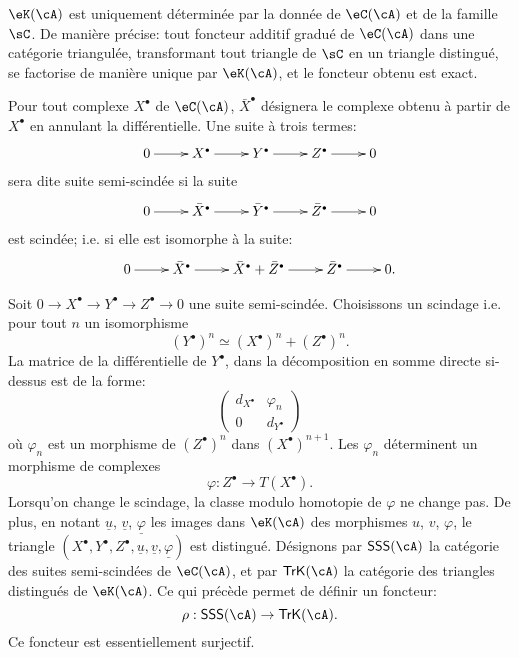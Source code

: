 $\eK(\cA)$ est uniquement déterminée par la donnée de $\eC(\cA)$ et de la 
famille $\sC$. De manière précise: tout foncteur additif gradué de 
$\eC(\cA)$ dans une catégorie triangulée, transformant tout triangle de 
$\sC$ en un triangle distingué, se factorise de manière unique par 
$\eK(\cA)$, et le foncteur obtenu est exact. 

Pour tout complexe $X^\bullet$ de $\eC(\cA)$, $\bar X^\bullet$ désignera le 
complexe obtenu à partir de $X^\bullet$ en annulant la différentielle. Une 
suite à trois termes: 
\[\xymatrix{
  0 \ar[r] 
    & X^\bullet \ar[r] 
    & Y^\bullet \ar[r] 
    & Z^\bullet \ar[r] 
    & 0 
}\]
sera dite suite semi-scindée si la suite 
\[\xymatrix{
  0 \ar[r] 
    & \bar X^\bullet \ar[r] 
    & \bar Y^\bullet \ar[r] 
    & \bar Z^\bullet \ar[r] 
    & 0 
}\]
est scindée; i.e. si elle est isomorphe à la suite: 
\[\xymatrix{
  0 \ar[r] 
    & \bar X^\bullet \ar[r] 
    & \bar X^\bullet + \bar Z^\bullet \ar[r] 
    & \bar Z^\bullet \ar[r] 
    & 0 \text{.}
}\]

Soit $0 \to X^\bullet \to Y^\bullet \to Z^\bullet \to 0$ une suite 
semi-scindée. Choisissons un scindage i.e. pour tout $n$ un isomorphisme 
\[
  (Y^\bullet)^n \simeq (X^\bullet)^n + (Z^\bullet)^n \text{.}
\]
La matrice de la différentielle de $Y^\bullet$, dans la décomposition en 
somme directe si-dessus est de la forme: 
\[
  \begin{pmatrix}
    d_{X^\bullet} & \varphi_n \\
    0 & d_{Y^\bullet} 
  \end{pmatrix}
\]
où $\varphi_n$ est un morphisme de $(Z^\bullet)^n$ dans 
$(X^\bullet)^{n+1}$. Les $\varphi_n$ déterminent un morphisme de complexes 
\[
  \varphi:Z^\bullet \to T(X^\bullet) \text{.}
\]
Lorsqu'on change le scindage, la classe modulo homotopie de $\varphi$ ne 
change pas. De plus, en notant $\underline u$, $\underline v$, 
$\underline\varphi$ les images dans $\eK(\cA)$ des morphismes $u$, $v$, 
$\varphi$, le triangle 
$(X^\bullet,Y^\bullet,Z^\bullet,\underline u,\underline v,\underline\varphi)$ 
est distingué. Désignons par $\mathsf{SSS}(\cA)$ la catégorie des 
suites semi-scindées de $\eC(\cA)$, et par $\mathsf{TrK}(\cA)$ la 
catégorie des triangles distingués de $\eK(\cA)$. Ce qui précède 
permet de définir un foncteur: 
\[
  \rho:\mathsf{SSS}(\cA) \to \mathsf{TrK}(\cA) \text{.}
\]
Ce foncteur est essentiellement surjectif. 










